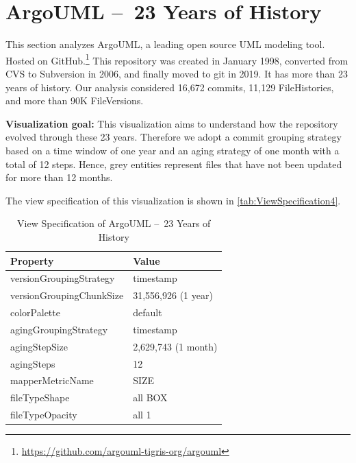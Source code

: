 \clearpage
\section{ArgoUML – 23 Years of History}
This section analyzes ArgoUML, a leading open source UML modeling tool. 
Hosted on GitHub.\footnote{\url{https://github.com/argouml-tigris-org/argouml}}
This repository was created in January 1998, converted from CVS to Subversion in 2006, and finally moved to git in 2019.
It has more than 23 years of history. 
Our analysis considered 16,672 commits, 11,129 FileHistories, and more than 90K FileVersions. 

\bigbreak
\label{subsec:view4}
\noindent
\textbf{Visualization goal:}
This visualization aims to understand how the repository evolved through these 23 years. Therefore we adopt a commit grouping strategy based on a time window of one year and an aging strategy of one month with a total of 12 steps. Hence, grey entities represent files that have not been updated for more than 12 months. 


The view specification of this visualization is shown in \autoref{tab:ViewSpecification4}.
\begin{table}[h]
	\small
    \centering
    \begin{tabular}{@{}ll@{}} 
        \toprule
        \textbf{Property} & \textbf{Value} \\\midrule
        versionGroupingStrategy & timestamp\\ 
		versionGroupingChunkSize & 31,556,926 (1 year)\\
		colorPalette & default\\
		agingGroupingStrategy & timestamp \\
		agingStepSize & 2,629,743 (1 month) \\
		agingSteps & 12 \\
		mapperMetricName & SIZE \\
		fileTypeShape & all BOX \\
		fileTypeOpacity & all 1 \\\bottomrule
    \end{tabular}
    \caption{View Specification of ArgoUML – 23 Years of History}
    \label{tab:ViewSpecification4}
\end{table}

